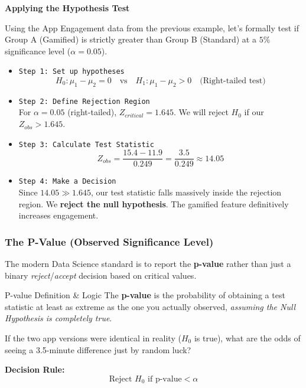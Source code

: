 \vspace{0.2cm}
\begin{example}{\textbf{Applying the Hypothesis Test}}

Using the App Engagement data from the previous example, let's formally test if Group A (Gamified) is strictly greater than Group B (Standard) at a $5\%$ significance level ($\alpha = 0.05$).

\begin{itemize}
    \item \texttt{Step 1: Set up hypotheses}
    \[
    H_0: \mu_1 - \mu_2 = 0 \quad \text{vs} \quad H_1: \mu_1 - \mu_2 > 0 \quad \text{(Right-tailed test)}
    \]
    
    \item \texttt{Step 2: Define Rejection Region} \\
    For $\alpha = 0.05$ (right-tailed), $Z_{critical} = 1.645$. We will reject $H_0$ if our $Z_{obs} > 1.645$.

    \vs
    
    \item \texttt{Step 3: Calculate Test Statistic}
    \[
    Z_{obs} = \frac{15.4 - 11.9}{0.249} = \frac{3.5}{0.249} \approx 14.05
    \]
    
    \item \texttt{Step 4: Make a Decision} \\
    Since $14.05 \gg 1.645$, our test statistic falls massively inside the rejection region. We \textbf{reject the null hypothesis}. The gamified feature definitively increases engagement.
\end{itemize}
\end{example}

\subsubsection{The P-Value (Observed Significance Level)}

The modern Data Science standard is to report the \textbf{p-value} rather than just a binary \textit{reject}/\textit{accept} decision based on critical values.

\begin{defbox}{P-value Definition \& Logic}
The \textbf{p-value} is the probability of obtaining a test statistic at least as extreme as the one you actually observed, \textit{assuming the Null Hypothesis is completely true}.

\vspace{0.2cm}
If the two app versions were identical in reality ($H_0$ is true), what are the odds of seeing a 3.5-minute difference just by random luck?

\vspace{0.2cm}
\textbf{Decision Rule:} 
\[
\text{Reject } H_0 \text{ if } \text{p-value} < \alpha
\]
\end{defbox}

